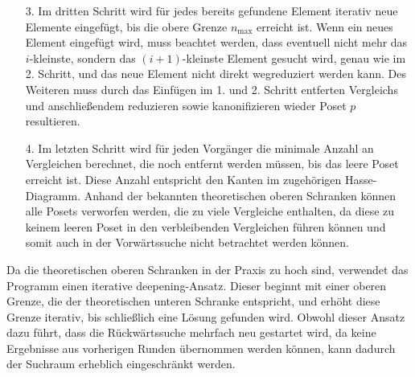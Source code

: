\documentclass[10pt,journal,compsoc]{IEEEtran}
\begin{document}
\begin{itemize}
    \begin{proof} \label{proof:remove_only_last_element_edge}
      Angenommen, es existiert ein Vorgänger mit $n + 1$ Elementen, bei dem das $(n + 1)$-te Element wegreduziert werden kann, wenn ein Vergleich zwischen dem $i$-ten und dem $j$-ten Element eingefügt wird, wobei $0 \leq i < j \leq n$.
      Dann ... %
    \end{proof}

    Anschließend werden die Posets aus dem 1. und 2. Schritt in einer Menge zusammengeführt und es wird sichergestellt, dass alle Posets kanonisiert sind.
    Bezeichne den Vergleich, der eingefügt werden könnte, ohne das ein Element wegreduziert werden kann im folgenden als den entfernten Vergleich.

  \item[3.]
    Im dritten Schritt wird für jedes bereits gefundene Element iterativ neue Elemente eingefügt, bis die obere Grenze $n_{\text{max}}$ erreicht ist.
    Wenn ein neues Element eingefügt wird, muss beachtet werden, dass eventuell nicht mehr das $i$-kleinste, sondern das $(i + 1)$-kleinste Element gesucht wird, genau wie im 2. Schritt, und das neue Element nicht direkt wegreduziert werden kann.
    Des Weiteren muss durch das Einfügen im 1. und 2. Schritt entferten Vergleichs und anschließendem reduzieren sowie kanonifizieren wieder Poset $p$ resultieren.

  \item[4.]
    Im letzten Schritt wird für jeden Vorgänger die minimale Anzahl an Vergleichen berechnet, die noch entfernt werden müssen, bis das leere Poset erreicht ist.
    Diese Anzahl entspricht den Kanten im zugehörigen Hasse-Diagramm.
    Anhand der bekannten theoretischen oberen Schranken können alle Posets verworfen werden, die zu viele Vergleiche enthalten, da diese zu keinem leeren Poset in den verbleibenden Vergleichen führen können und somit auch in der Vorwärtssuche nicht betrachtet werden können.
\end{itemize}

Da die theoretischen oberen Schranken in der Praxis zu hoch sind, verwendet das Programm einen iterative deepening-Ansatz.
Dieser beginnt mit einer oberen Grenze, die der theoretischen unteren Schranke entspricht, und erhöht diese Grenze iterativ, bis schließlich eine Lösung gefunden wird.
Obwohl dieser Ansatz dazu führt, dass die Rückwärtssuche mehrfach neu gestartet wird, da keine Ergebnisse aus vorherigen Runden übernommen werden können, kann dadurch der Suchraum erheblich eingeschränkt werden.
\end{document}

